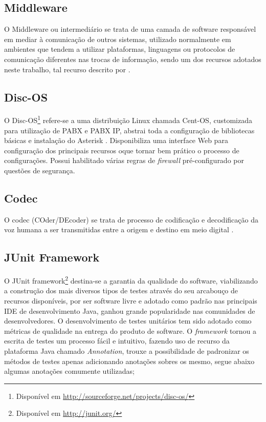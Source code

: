 \subsection{Middleware}
O Middleware ou intermediário se trata de uma camada de software responsável em mediar à comunicação de outros sistemas, utilizado normalmente em ambientes que tendem a utilizar plataformas, linguagens ou protocolos de comunicação diferentes nas trocas de informação, sendo um dos recursos adotados neste trabalho, tal recurso descrito por .

\subsection{Disc-OS}
O Disc-OS\footnote{Disponível em \url{http://sourceforge.net/projects/disc-os/}}\label{key:DISC-OS} refere-se a uma distribuição Linux chamada Cent-OS, customizada para utilização de PABX e PABX IP, abstrai toda a configuração de bibliotecas básicas e instalação do Asterisk \cite{DARU:2008}. Disponibiliza uma interface Web para configuração dos principais recursos oque tornar bem prático o processo de configurações. Possui habilitado várias regras de \textit{firewall} pré-configurado por questões de segurança.

\subsection{Codec}
O codec (COder/DEcoder) se trata de processo de codificação e decodificação da voz humana a ser transmitidas entre a origem e destino em meio digital \cite{VIEIRA:2007}.

\subsection{JUnit Framework}
O JUnit framework\footnote{Disponível em \url{http://junit.org/}} destina-se a garantia da qualidade do software, viabilizando a construção dos mais diversos tipos de testes através do seu arcabouço de recursos disponíveis, por ser software livre e adotado como padrão nas principais IDE de desenvolvimento Java, ganhou grande popularidade nas comunidades de desenvolvedores. O desenvolvimento de testes unitários tem sido adotado como métricas de qualidade na entrega do produto de software.
O \textit{framework} tornou a escrita de testes um processo fácil e intuitivo, fazendo uso de recurso da plataforma Java chamado \textit{Annotation}\label{key:annotation}, trouxe a possibilidade de padronizar os métodos de testes apenas adicionando anotações sobres os mesmo, segue abaixo algumas anotações comumente utilizadas;

